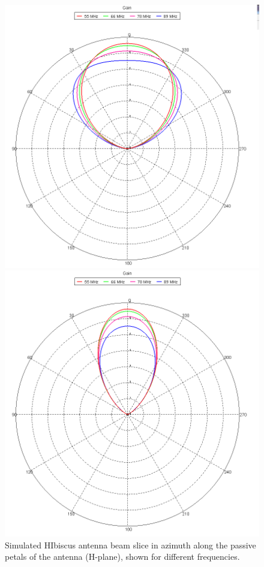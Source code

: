 \begin{figure}[htb]
\centering
\begin{minipage}[b]{0.47\textwidth}
\centering
\includegraphics[width=0.95\linewidth]{SCIHI_system/figures/HIbiscus_sim_gain_beam1.png}
\caption{Simulated HIbiscus antenna beam slice in azimuth along the passive petals of the antenna (H-plane), shown for different frequencies.}
\label{Fig:HIsym_beam}
\end{minipage}%
\begin{minipage}[b]{0.02\textwidth}
\hspace{1cm}
\end{minipage}%
\begin{minipage}[b]{0.47\textwidth}
\centering
\includegraphics[width=0.95\linewidth]{SCIHI_system/figures/HIbiscus_sim_gain_beam2.png}

\end{minipage}
\end{figure}
